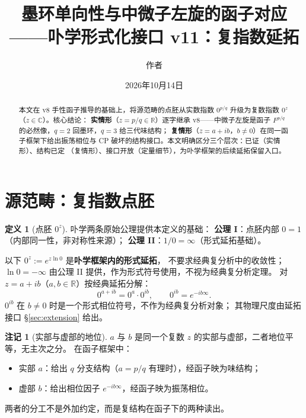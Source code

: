 \documentclass[11pt]{ctexart}
\theoremstyle{plain}
\theoremstyle{definition}
\newtheorem{defn}[thm]{定义}
\newtheorem{rem}[thm]{注记}
\begin{document}
\title{墨环单向性与中微子左旋的函子对应\\
{\large ——卟学形式化接口 v11：复指数延拓}}
\author{作者}
\date{2026年10月14日}
\maketitle

\begin{abstract}
本文在 v8 手性函子推导的基础上，将源范畴的点胚从实数指数 $0^{p/q}$
升级为复数指数 $0^{z}$（$z\in\mathbb{C}$）。核心结论：
\textbf{实情形}（$z=p/q\in\mathbb{R}$）逐字继承 v8——中微子左旋是函子
$F^{p/q}$ 的必然像，$q=2$ 回墨环，$q=3$ 给三代味结构；
\textbf{复情形}（$z=a+ib$，$b\neq 0$）在同一函子框架下给出振荡相位与
CP 破坏的结构接口。本文明确区分三个层次：已证（实情形）、结构已定
（复情形）、接口开放（定量细节），为卟学框架的后续延拓保留入口。
\end{abstract}

\section{源范畴：复指数点胚}

\begin{defn}[点胚 $0^z$]\label{def:pointseed}
卟学两条原始公理提供本定义的基础：
\textbf{公理 I}：点胚内部 $0=1$（内部同一性，非对称性来源）；
\textbf{公理 II}：$1/0=\infty$（形式延拓基础）。

以下 $0^z := e^{z\ln 0}$ 是\textbf{卟学框架内的形式延拓}，
不要求经典复分析中的收敛性；$\ln 0 = -\infty$ 由公理 II
提供，作为形式符号使用，不视为经典复分析定理。
对 $z = a+ib$（$a,b\in\mathbb{R}$）按经典延拓分解：
\[
0^{a+ib} = 0^a\cdot 0^{ib},\qquad 0^{ib} = e^{-ib\infty}.
\]
$0^{ib}$ 在 $b\neq 0$ 时是一个形式相位符号，不作为经典复分析对象；
其物理尺度由延拓接口 \S\ref{sec:extension} 给出。
\end{defn}

\begin{rem}[实部与虚部的地位]\label{rem:ab}
$a$ 与 $b$ 是同一个复数 $z$ 的实部与虚部，二者地位平等，无主次之分。
在函子框架中：
\begin{itemize}
\item 实部 $a$：给出 $q$ 分支结构（$a = p/q$ 有理时），经函子映为味结构；
\item 虚部 $b$：给出相位因子 $e^{-ib\infty}$，经函子映为振荡相位。
\end{itemize}
两者的分工不是外加约定，而是复结构在函子下的两种读出。
\end{rem}
\end{document}
